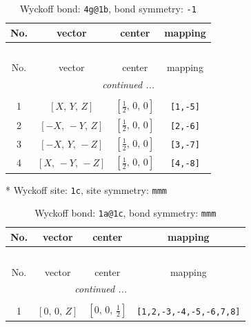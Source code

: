 \documentclass[fleqn,8pt]{jsarticle}
\begin{document}
\begin{longtable}{cccc}
\caption{Wyckoff bond: {\tt 4g@1b}, bond symmetry: {\tt -1}}
 \\
 \hline \hline
No. & vector & center & mapping \\ \hline \endfirsthead

\multicolumn{3}{l}{\tablename\ \thetable{}} \\
 \hline \hline
No. & vector & center & mapping \\ \hline \endhead

 \hline \hline
\multicolumn{3}{r}{\footnotesize\it continued ...} \\ \endfoot

 \hline \hline
\multicolumn{3}{r}{} \\ \endlastfoot

1 & $\left[ X,\, Y,\, Z \right]$ & $\left[ \frac{1}{2},\, 0,\, 0 \right]$ & {\tt [1,-5]} \\ \hline
2 & $\left[ - X,\, - Y,\, Z \right]$ & $\left[ \frac{1}{2},\, 0,\, 0 \right]$ & {\tt [2,-6]} \\ \hline
3 & $\left[ - X,\, Y,\, - Z \right]$ & $\left[ \frac{1}{2},\, 0,\, 0 \right]$ & {\tt [3,-7]} \\ \hline
4 & $\left[ X,\, - Y,\, - Z \right]$ & $\left[ \frac{1}{2},\, 0,\, 0 \right]$ & {\tt [4,-8]} \\
\end{longtable}
* Wyckoff site: {\tt 1c}, site symmetry: {\tt mmm}
\renewcommand{\arraystretch}{1.2}
\begin{longtable}{cccc}
\caption{Wyckoff bond: {\tt 1a@1c}, bond symmetry: {\tt mmm}}
 \\
 \hline \hline
No. & vector & center & mapping \\ \hline \endfirsthead

\multicolumn{3}{l}{\tablename\ \thetable{}} \\
 \hline \hline
No. & vector & center & mapping \\ \hline \endhead

 \hline \hline
\multicolumn{3}{r}{\footnotesize\it continued ...} \\ \endfoot

 \hline \hline
\multicolumn{3}{r}{} \\ \endlastfoot

1 & $\left[ 0,\, 0,\, Z \right]$ & $\left[ 0,\, 0,\, \frac{1}{2} \right]$ & {\tt [1,2,-3,-4,-5,-6,7,8]} \\
\end{longtable}
\end{document}

